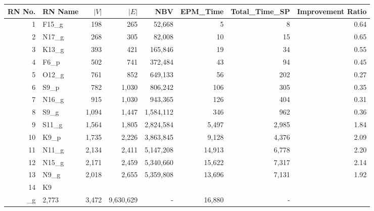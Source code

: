 \begin{tabular}{rlrrrrrr}
\toprule
RN No. & RN Name & $|V|$ & $|E|$ & NBV & EPM_Time & Total_Time_SP & Improvement Ratio \\
\midrule
1 & F15\_g & 198 & 265 & 52,668 & 5 & 8 & 0.64 \\
2 & N17\_g & 268 & 305 & 82,008 & 10 & 15 & 0.65 \\
3 & K13\_g & 393 & 421 & 165,846 & 19 & 34 & 0.55 \\
4 & F6\_p & 502 & 741 & 372,484 & 43 & 94 & 0.45 \\
5 & O12\_g & 761 & 852 & 649,133 & 56 & 202 & 0.27 \\
6 & S9\_p & 782 & 1,030 & 806,242 & 106 & 305 & 0.35 \\
7 & N16\_g & 915 & 1,030 & 943,365 & 126 & 404 & 0.31 \\
8 & S9\_g & 1,094 & 1,447 & 1,584,112 & 346 & 962 & 0.36 \\
9 & S11\_g & 1,564 & 1,805 & 2,824,584 & 5,497 & 2,985 & 1.84 \\
10 & K9\_p & 1,735 & 2,226 & 3,863,845 & 9,128 & 4,376 & 2.09 \\
11 & N11\_g & 2,134 & 2,411 & 5,147,208 & 14,913 & 6,778 & 2.20 \\
12 & N15\_g & 2,171 & 2,459 & 5,340,660 & 15,622 & 7,317 & 2.14 \\
13 & N9\_g & 2,018 & 2,655 & 5,359,808 & 13,696 & 7,131 & 1.92 \\
14 & K9\\_g & 2,773 & 3,472 & 9,630,629 & - & 16,880 & - \\
\bottomrule
\end{tabular}
